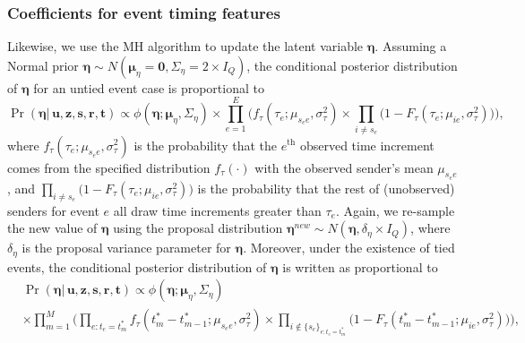 \documentclass[ba]{imsart}
\numberwithin{equation}{section}
\theoremstyle{plain}
\begin{document}
	\subsubsection{Coefficients for event timing features}
	Likewise, we use the MH algorithm to update the latent variable $\boldsymbol{\eta}$. Assuming a Normal prior $\boldsymbol{\eta}\sim N(\boldsymbol{\mu}_\eta = \boldsymbol{0}, \Sigma_\eta = 2\times I_Q)$, the conditional posterior distribution of $\boldsymbol{\eta}$ for an untied event case is proportional to~
	\begin{equation}
		\Pr(\boldsymbol{\eta}|\, \boldsymbol{u}, \boldsymbol{z},\boldsymbol{s}, \boldsymbol{r},\boldsymbol{t})\propto  \phi(\boldsymbol{\eta}; \boldsymbol{\mu}_\eta, \Sigma_\eta)\times\prod_{e=1}^E\Big(f_{\tau}(\tau_{e}; \mu_{s_e e}, \sigma_\tau^2)\times \prod_{i\neq s_e}\big(1-F_{\tau}(\tau_{e}; \mu_{ie}, \sigma_\tau^2) \big)\Big),
		\label{eqn:latenttime}
	\end{equation}
	where $f_{\tau}(\tau_{e}; \mu_{s_e e}, \sigma_\tau^2)$ is the probability that the $e^{\textrm{th}}$ observed time increment comes from the specified distribution $f_\tau(\cdot)$ with the observed sender's mean $\mu_{s_e e}$, and $\prod_{i\neq s_e}\big(1-F_{\tau}(\tau_{e}; \mu_{ie},\sigma_\tau^2) \big)$ is the probability that the rest of (unobserved) senders for event $e$ all draw time increments greater than $\tau_e$.
	Again, we re-sample the new value of $\boldsymbol{\eta}$ using the proposal distribution $\boldsymbol{\eta}^{new}\sim N(\boldsymbol{\eta}, \delta_\eta\times I_Q)$, where $\delta_\eta$ is the proposal variance parameter for $\boldsymbol{\eta}$. Moreover, under the existence of tied events, the conditional posterior distribution of $\boldsymbol{\eta}$ is written as proportional to
	\begin{equation}
		\begin{aligned}
			&\Pr(\boldsymbol{\eta}|\, \boldsymbol{u}, \boldsymbol{z},\boldsymbol{s}, \boldsymbol{r},\boldsymbol{t})\propto \phi(\boldsymbol{\eta}; \boldsymbol{\mu}_\eta, \Sigma_\eta)\\&\times \prod_{m=1}^M\Big(\prod_{e:t_e=t_m^*}f_{\tau}(t_m^*-t_{m-1}^*; \mu_{s_e e}, \sigma_\tau^2) \times \prod_{i \notin \{s_e\}_{e:t_e=t_m^*}}\big(1-F_{\tau}(t_m^*-t_{m-1}^*; \mu_{ie}, \sigma_\tau^2) \big)\Big),
		\end{aligned}
		\label{eqn:latenttime2}
	\end{equation}
\end{document}
